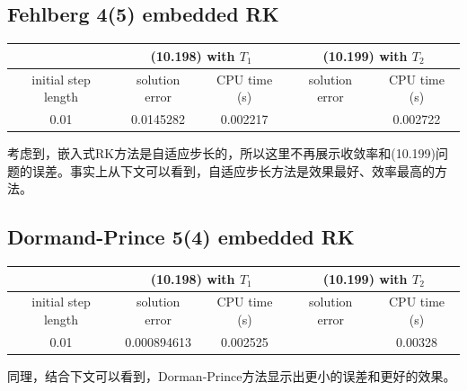 \documentclass[a4paper,11.5pt,UTF8]{ctexart}
\begin{document}
\begin{large}
\subsection{Fehlberg 4(5) embedded RK}
\begin{center}
\begin{tabular}{|c|c|c|c|c|}
    \hline
     & \multicolumn{2}{c|}{(10.198) with $T_1$} & \multicolumn{2}{c|}{(10.199) with $T_2$} \\
     \hline
     initial step length & solution error & CPU time (s) & solution error & CPU time (s) \\
     \hline
     0.01 & 0.0145282 & 0.002217 &  & 0.002722 \\
     \hline
\end{tabular}
\end{center}
\par 考虑到，嵌入式RK方法是自适应步长的，所以这里不再展示收敛率和(10.199)问题的误差。事实上从下文可以看到，自适应步长方法是效果最好、效率最高的方法。

\subsection{Dormand-Prince 5(4) embedded RK}
\begin{center}
\begin{tabular}{|c|c|c|c|c|}
    \hline
     & \multicolumn{2}{c|}{(10.198) with $T_1$} & \multicolumn{2}{c|}{(10.199) with $T_2$} \\
     \hline
     initial step length & solution error & CPU time (s) & solution error & CPU time (s) \\
     \hline
     0.01 & 0.000894613 & 0.002525 &  & 0.00328 \\
     \hline
\end{tabular}
\end{center}
\par 同理，结合下文可以看到，Dorman-Prince方法显示出更小的误差和更好的效果。


\end{large}
\end{document}
